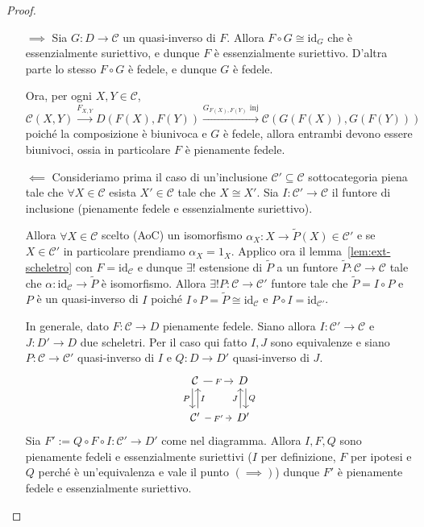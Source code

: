 \begin{proof}\( \)
\begin{itemize}
    \item[\(\implies \)] Sia \(G : D \to \mathcal{C}\) un quasi-inverso di \(F\). Allora
        \(F \circ G \cong \mathrm{id}_G\) che è essenzialmente suriettivo, e
        dunque \(F\) è essenzialmente suriettivo. D'altra parte lo stesso \(F
        \circ G\) è fedele, e dunque \(G\) è fedele.
        
        Ora, per ogni \(X, Y \in \mathcal{C}\),
        \[
          \mathcal{C}{(X, Y)} \overset{F_{X,Y} }{\to } D{(F{(X)}, F{(Y)})} \overset{G_{F{(X)}, F{(Y)}}  \text{ inj}}{\to} \mathcal{C}{(G{(F{(X)})}, G{(F{(Y)})})}
        \]
        poiché la composizione è biunivoca e \(G\) è fedele, allora entrambi
        devono essere biunivoci, ossia in particolare \(F\) è pienamente fedele.
    \item[\(\impliedby \)] Consideriamo prima il caso di un'inclusione \(\mathcal{C}' \subseteq \mathcal{C} \) sottocategoria piena tale che \(\forall X \in \mathcal{C}\) esista \(X' \in \mathcal{C}\) tale che \(X \cong X'\). 
        Sia \(I : \mathcal{C}' \to \mathcal{C}\) il funtore di inclusione (pienamente fedele e
        essenzialmente suriettivo).

        Allora \(\forall X \in \mathcal{C}\) scelto (AoC) un
        isomorfismo \(\alpha_X : X \to \tilde{P}{(X)} \in \mathcal{C}'\) e se \(X \in 
        \mathcal{C}'\) in particolare prendiamo \(\alpha_X = 1_X\). Applico ora il
        lemma~\ref{lem:ext-scheletro} con \(F = \mathrm{id}_\mathcal{C}\) e dunque \(\exists !\) estensione di \(\tilde{P}\) a un funtore \(\tilde{P} : \mathcal{C} \to \mathcal{C}\) tale che \(\alpha : \mathrm{id}_\mathcal{C} \to \tilde{P}\) è isomorfismo. Allora \(\exists ! P : \mathcal{C} \to \mathcal{C}'\) funtore tale che \(\tilde{P} = I \circ P\) e \(P\) è un quasi-inverso di \(I\) poiché \(I \circ P = \tilde{P} \cong \mathrm{id}_\mathcal{C}\) e \(P \circ I = \mathrm{id}_{\mathcal{C}'}\).

        In generale, dato \(F : \mathcal{C} \to D\) pienamente fedele. Siano allora \(
        I : \mathcal{C}' \to \mathcal{C}\) e \(J : D' \to D\) due scheletri. Per il caso qui fatto
        \(I, J\) sono equivalenze e siano \(P : \mathcal{C}\to \mathcal{C}'\) quasi-inverso di \(I\) e \(Q : D \to D'\) quasi-inverso di \(J\).
\[\begin{tikzcd}
	\mathcal{C} & D \\
	{\mathcal{C}'} & {D'}
	\arrow["F"{description}, from=1-1, to=1-2]
	\arrow["P"', shift right, from=1-1, to=2-1]
	\arrow["Q", shift left, from=1-2, to=2-2]
	\arrow["I"', shift right, from=2-1, to=1-1]
	\arrow["{F'}"{description}, from=2-1, to=2-2]
	\arrow["J", shift left, from=2-2, to=1-2]
\end{tikzcd}\]
    Sia \(F' := Q \circ F \circ I : \mathcal{C}' \to D'\) come nel diagramma. Allora \(
    I, F, Q\) sono pienamente fedeli e essenzialmente suriettivi (\(I\) per
    definizione, \(F\) per ipotesi e \(Q\) perché è un'equivalenza e vale il
    punto \({(\implies )}\)) dunque \(
    F'\) è pienamente fedele e essenzialmente suriettivo.


\end{itemize}
\end{proof}
